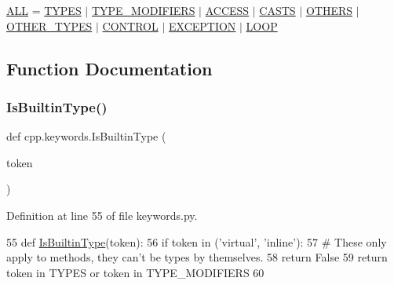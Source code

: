 \begin{DoxyCompactItemize}
\item 
\hyperlink{namespacecpp_1_1keywords_a2e8727b78fb9434c99ac8518c6dd1ecc}{A\+LL} = \hyperlink{namespacecpp_1_1keywords_a56fd5baf357970548e1ec366edfc2c13}{T\+Y\+P\+ES} $\vert$ \hyperlink{namespacecpp_1_1keywords_af9282ce418d6b4b43dca5ed574caedd7}{T\+Y\+P\+E\+\_\+\+M\+O\+D\+I\+F\+I\+E\+RS} $\vert$ \hyperlink{namespacecpp_1_1keywords_a786f41bbea982641425c819d10bb2064}{A\+C\+C\+E\+SS} $\vert$ \hyperlink{namespacecpp_1_1keywords_aeba38dc38e188040f4ec44ba05092e7f}{C\+A\+S\+TS} $\vert$ \hyperlink{namespacecpp_1_1keywords_a15fe231fbad145538b73892804898809}{O\+T\+H\+E\+RS} $\vert$ \hyperlink{namespacecpp_1_1keywords_aa86a5e35a3ace14022a5ca1b91baf207}{O\+T\+H\+E\+R\+\_\+\+T\+Y\+P\+ES} $\vert$ \hyperlink{namespacecpp_1_1keywords_a374dfe9c96681079802ba4724287b8ff}{C\+O\+N\+T\+R\+OL} $\vert$ \hyperlink{namespacecpp_1_1keywords_a2665fb8a25a4dae03fa5d3dc975c537c}{E\+X\+C\+E\+P\+T\+I\+ON} $\vert$ \hyperlink{namespacecpp_1_1keywords_af0164c05398a2291487b76414102d555}{L\+O\+OP}
\end{DoxyCompactItemize}


\subsection{Function Documentation}
\mbox{\label{namespacecpp_1_1keywords_ae0f7a581fef26ad1a71c59bd963ee285}} 
\subsubsection{\texorpdfstring{Is\+Builtin\+Type()}{IsBuiltinType()}}
{\footnotesize\ttfamily def cpp.\+keywords.\+Is\+Builtin\+Type (\begin{DoxyParamCaption}\item[{}]{token }\end{DoxyParamCaption})}



Definition at line 55 of file keywords.\+py.


\begin{DoxyCode}
55 \textcolor{keyword}{def }\hyperlink{namespacecpp_1_1keywords_ae0f7a581fef26ad1a71c59bd963ee285}{IsBuiltinType}(token):
56     \textcolor{keywordflow}{if} token \textcolor{keywordflow}{in} (\textcolor{stringliteral}{'virtual'}, \textcolor{stringliteral}{'inline'}):
57         \textcolor{comment}{# These only apply to methods, they can't be types by themselves.}
58         \textcolor{keywordflow}{return} \textcolor{keyword}{False}
59     \textcolor{keywordflow}{return} token \textcolor{keywordflow}{in} TYPES \textcolor{keywordflow}{or} token \textcolor{keywordflow}{in} TYPE\_MODIFIERS
60 \end{DoxyCode}
\mbox{\label{namespacecpp_1_1keywords_ab9edc2cbd4a9d5ad58a1c0ad3281cbc9}} 

